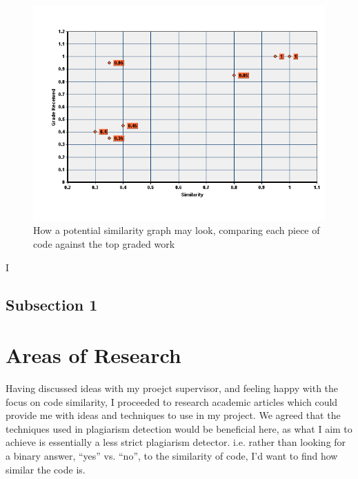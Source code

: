 \begin{figure}[h!]
	\centering
		\includegraphics[width=\textwidth]{Figures/similarityVsGradeGraph}
	\caption{How a potential similarity graph may look, comparing each piece of
	code against the top graded work}
	\label{fig:SimilarityVsGradeGraph}
\end{figure}

I



\subsection{Subsection 1}



\section{Areas of Research}

Having discussed ideas with my proejct supervisor, and feeling happy with the
focus on code similarity, I proceeded to research academic articles which could
provide me with ideas and techniques to use in my project. We agreed that the
techniques used in plagiarism detection would be beneficial here, as what I aim
to achieve is essentially a less strict plagiarism detector. i.e. rather than
looking for a binary answer, ``yes'' vs. ``no'', to the similarity of code, I'd
want to find how similar the code is.

